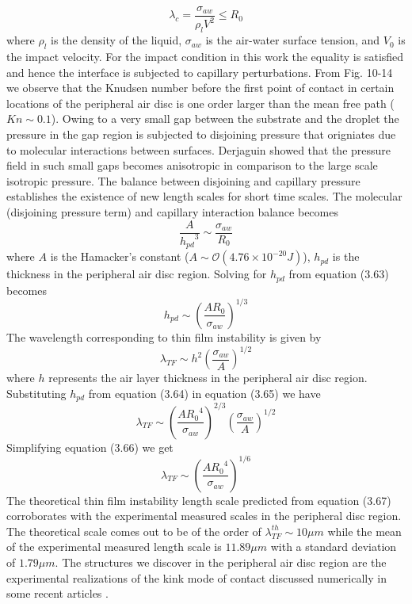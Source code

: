 \documentclass{jfm}
\begin{document}
\begin{equation}
    {\lambda}_c=\frac{{\sigma}_{aw}}{{\rho}_lV^2}{\leq}R_0
\end{equation}
where ${\rho}_l$ is the density of the liquid, ${\sigma}_{aw}$ is the air-water surface tension, and $V_0$ is the impact velocity.
For the impact condition in this work the equality is satisfied and hence the interface is subjected to capillary perturbations. 
From Fig. 10-14 we observe that the Knudsen number before the first point of contact in certain locations of the peripheral air disc is one order larger than the mean free path ($Kn{\sim}0.1$). Owing to a very small gap between the substrate and the droplet the pressure in the gap region is subjected to disjoining pressure that origniates due to molecular interactions between surfaces. Derjaguin \citep{derjaguin1978question} showed that the pressure field in such small gaps becomes anisotropic in comparison to the large scale isotropic pressure. The balance between disjoining and capillary pressure establishes the existence of new length scales for short time scales. The molecular (disjoining pressure term) and capillary interaction balance becomes \citep{roy2022droplet}
\begin{equation}
    \frac{A}{{h_{pd}}^3}{\sim}\frac{{\sigma}_{aw}}{R_0}
\end{equation}
where $A$ is the Hamacker's constant ($A{\sim}\mathcal{O}(4.76{\times}10^{-20}J)$), $h_{pd}$ is the thickness in the peripheral air disc region. Solving for $h_{pd}$ from equation (3.63) becomes
\begin{equation}
    h_{pd}{\sim}\left(\frac{AR_0}{{\sigma}_{aw}}\right)^{1/3}
\end{equation}
The wavelength corresponding to thin film instability is given by \citep{vrij1966possible,roy2022droplet}
\begin{equation}
    {\lambda}_{TF}{\sim}h^2\left(\frac{{\sigma}_{aw}}{A}\right)^{1/2}
\end{equation}
    where $h$ represents the air layer thickness in the peripheral air disc region. Substituting $h_{pd}$ from equation (3.64) in equation (3.65) we have
\begin{equation}
    {\lambda}_{TF}{\sim}\left(\frac{A{R_0}^4}{{\sigma}_{aw}}\right)^{2/3}\left(\frac{{\sigma}_{aw}}{A}\right)^{1/2}
\end{equation}
Simplifying equation (3.66) we get
\begin{equation}
    {\lambda}_{TF}{\sim}\left(\frac{A{R_0}^4}{{\sigma}_{aw}}\right)^{1/6}
\end{equation}
The theoretical thin film instability length scale predicted from equation (3.67) corroborates with the experimental measured scales in the peripheral disc region. The theoretical scale comes out to be of the order of ${{\lambda}^{th}_{TF}}{\sim}10{\mu}m$ while the mean of the experimental measured length scale is $11.89{\mu}m$ with a standard deviation of $1.79{\mu}m$. The structures we discover in the peripheral air disc region are the experimental realizations of the kink mode of contact discussed numerically in some recent articles \citep{de2015air-1,chubynsky2020bouncing}. 
\end{document}
